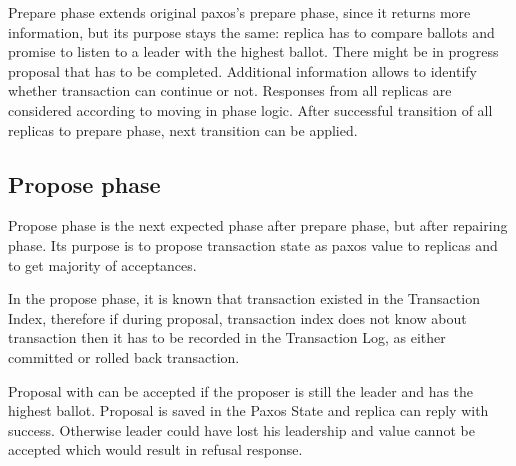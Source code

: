 Prepare phase extends original paxos’s prepare phase, since it returns more information, but its purpose stays the same: replica has to compare ballots and promise to listen to a leader with the highest ballot. 
There might be in progress proposal that has to be completed. Additional information allows to identify whether transaction can continue or not. Responses from all replicas are considered according to moving in phase logic.
After successful transition of all replicas to prepare phase, next transition can be applied.


\subsection{Propose phase}
Propose phase is the next expected phase after prepare phase, but after repairing phase. Its purpose is to propose transaction state as paxos value to replicas and to get majority of acceptances. 

In the propose phase, it is known that transaction existed in the Transaction Index, therefore if during proposal,  transaction index does not know about transaction then it has to be recorded in the Transaction Log, as either committed or rolled back transaction.

Proposal with \txState can be accepted if the proposer is still the leader and has the highest ballot. Proposal is saved in the Paxos State and replica can reply with success. Otherwise leader could have lost his leadership and value cannot be accepted which would result in refusal response.


